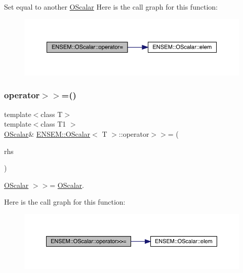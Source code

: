 Set equal to another \mbox{\hyperlink{classENSEM_1_1OScalar}{O\+Scalar}} Here is the call graph for this function\+:
\nopagebreak
\begin{figure}[H]
\begin{center}
\leavevmode
\includegraphics[width=350pt]{da/d80/classENSEM_1_1OScalar_aa6400023b45eed547bcb84c395fa1520_cgraph}
\end{center}
\end{figure}
\mbox{\label{classENSEM_1_1OScalar_a38ab5a0779184c6ca5a1b3211e2e38ca}} 
\subsubsection{\texorpdfstring{operator$>$$>$=()}{operator>>=()}\hspace{0.1cm}{\footnotesize\ttfamily [1/3]}}
{\footnotesize\ttfamily template$<$class T$>$ \\
template$<$class T1 $>$ \\
\mbox{\hyperlink{classENSEM_1_1OScalar}{O\+Scalar}}\& \mbox{\hyperlink{classENSEM_1_1OScalar}{E\+N\+S\+E\+M\+::\+O\+Scalar}}$<$ T $>$\+::operator$>$$>$= (\begin{DoxyParamCaption}\item[{const \mbox{\hyperlink{classENSEM_1_1OScalar}{O\+Scalar}}$<$ T1 $>$ \&}]{rhs }\end{DoxyParamCaption})\hspace{0.3cm}{\ttfamily [inline]}}



\mbox{\hyperlink{classENSEM_1_1OScalar}{O\+Scalar}} $>$$>$= \mbox{\hyperlink{classENSEM_1_1OScalar}{O\+Scalar}}. 

Here is the call graph for this function\+:
\nopagebreak
\begin{figure}[H]
\begin{center}
\leavevmode
\includegraphics[width=350pt]{da/d80/classENSEM_1_1OScalar_a38ab5a0779184c6ca5a1b3211e2e38ca_cgraph}
\end{center}
\end{figure}
\mbox{\label{classENSEM_1_1OScalar_a38ab5a0779184c6ca5a1b3211e2e38ca}} 
